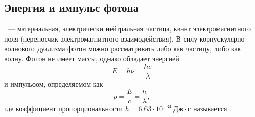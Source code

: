 \subsection{Энергия и импульс фотона}
~--- материальная, электрически нейтральная частица, квант электромагнитного поля (переносчик электромагнитного взаимодействия). В силу корпускулярно-волнового дуализма фотон можно рассматривать либо как частицу, либо как волну. Фотон не имеет массы, однако обладает энергией
\begin{equation}
	E = h \nu = \frac{h c}{\lambda}
\end{equation}
и импульсом, определяемом как
\begin{equation}
	p = \frac{E}{c} = \frac{h}{\lambda},
\end{equation}
где коэффициент пропорциональности $h = 6.63 \cdot 10^{-34}~\text{Дж}\cdot\text{с}$ называется .